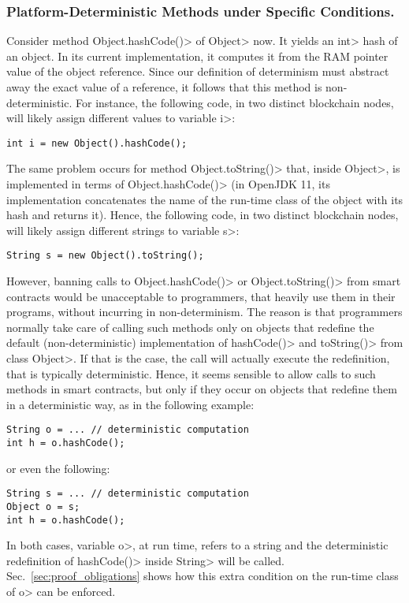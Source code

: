 \subsubsection*{Platform-Deterministic Methods under Specific Conditions.}
Consider method \<Object.hashCode()> of \<Object> now. It yields an \<int>
hash of an object. In its current implementation, it computes it from the
RAM pointer value of the object reference.
Since our definition of determinism must abstract away
the exact value of a reference, it follows that this method is non-deterministic.
For instance, the following code, in two distinct blockchain nodes,
will likely assign different values to variable \<i>:
%
\begin{verbatim}
int i = new Object().hashCode();
\end{verbatim}
%
The same problem occurs for method \<Object.toString()> that, inside
\<Object>, is implemented in terms of \<Object.hashCode()> (in OpenJDK 11, its
implementation concatenates
the name of the run-time class of the object with its hash and returns it).
Hence, the following code, in two distinct blockchain nodes,
will likely assign different strings to variable \<s>:
%
\begin{verbatim}
String s = new Object().toString();
\end{verbatim}
%
However, banning calls to \<Object.hashCode()> or \<Object.toString()>
from smart contracts would be unacceptable to programmers, that
heavily use them in their programs, without incurring in
non-determinism. The reason is that programmers normally
take care of calling such methods only on objects that redefine
the default (non-deterministic) implementation of
\<hashCode()> and \<toString()> from class \<Object>.
If that is the case, the call will actually
execute the redefinition, that is typically deterministic. Hence, it seems sensible
to allow calls to such methods in smart contracts, but only if they occur
on objects that redefine them in a deterministic way, as in the following example:
%
\begin{verbatim}
String o = ... // deterministic computation
int h = o.hashCode();
\end{verbatim}
%
or even the following:
%
\begin{verbatim}
String s = ... // deterministic computation
Object o = s;
int h = o.hashCode();
\end{verbatim}
%
In both cases, variable \<o>, at run time,
refers to a string and the deterministic redefinition of
\<hashCode()> inside \<String> will be called.
Sec.~\ref{sec:proof_obligations} shows how this extra condition on the run-time class of
\<o> can be enforced.
